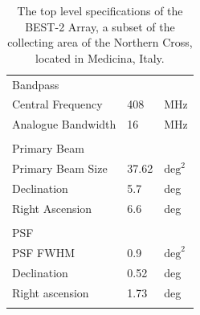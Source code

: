 \documentclass[useAMS,macros,usenatbib]{mn2e}
\begin{document}
\begin{table}
\begin{tabular}{| l | l | l |}
				      &            &            	\\
      \hline
      Bandpass        		&            &       		\\
      \hline
      Central Frequency 		&        408 &        MHz 	\\
      Analogue Bandwidth 		&         16 &        MHz 	\\
				      &            &            	\\
      \hline
      Primary Beam 			&            &           	\\
      \hline
      Primary Beam Size 		&      37.62 & $\textrm{deg}^2$ \\
      Declination 			&        5.7 &        deg 	\\
      Right Ascension 		&        6.6 &        deg 	\\
				      &            &            	\\
      \hline
      PSF    				&            &       		\\
      \hline
      PSF FWHM 			&        0.9 & $\textrm{deg}^2$ \\
      Declination 			&       0.52 &     deg 		\\
      Right ascension 		&       1.73 &     deg 		\\
				      &            &            	\\
      \hline
      \end{tabular}
      \caption{The top level specifications of the BEST-2 Array, a subset of the collecting area of the Northern Cross, located in Medicina, Italy.}
      \label{tbl:best2}
\end{table}

  


\end{document}
